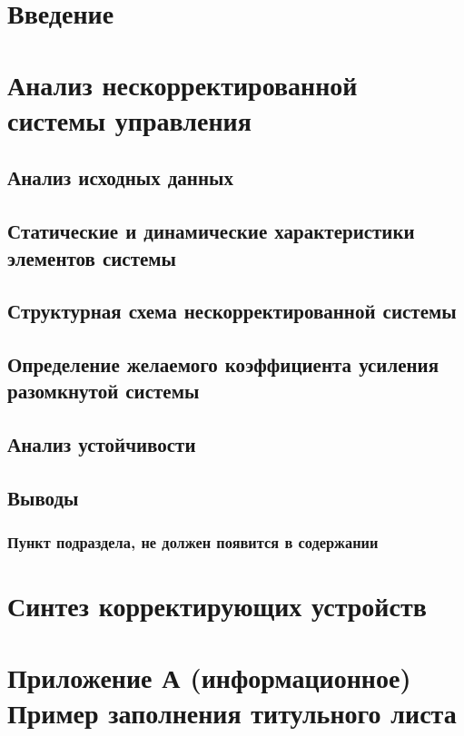 \section*{Введение}
\section{Анализ нескорректированной системы управления}
\subsection{Анализ исходных данных} 
\subsection{Статические и динамические характеристики элементов системы} 
\subsection{Структурная схема нескорректированной системы} 
\subsection{Определение желаемого коэффициента усиления разомкнутой системы} 
\subsection{Анализ устойчивости} 
\subsection{Выводы} 
\subsubsection{Пункт подраздела, не должен появится в содержании}
\section{Синтез корректирующих устройств}
\section*{Приложение А (информационное)  Пример заполнения титульного листа}

